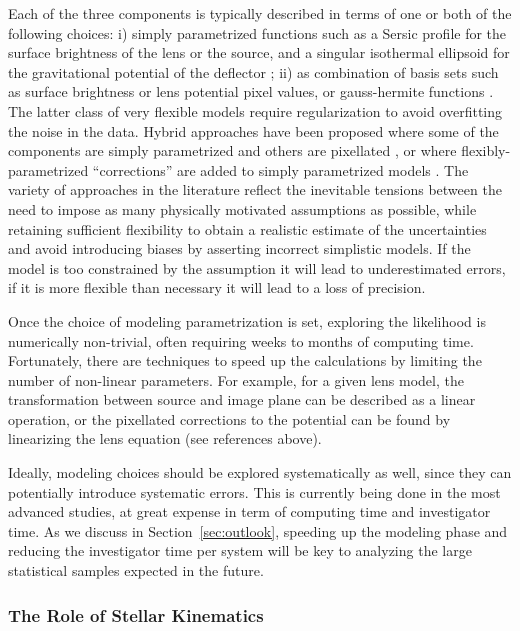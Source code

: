 Each of the three components is typically described in terms of one or
both of the following choices:
i) simply parametrized functions such as a Sersic profile
for the surface brightness of the lens or the source, and a singular
isothermal ellipsoid for the gravitational potential of the deflector
\citep[e.g.][]{Mar++07,Kee11}; ii) as combination of basis sets such as surface brightness
or lens potential pixel values, or gauss-hermite functions
\citep[e.g.][]{Col10, BirrerEtal2015, Nig++15}. The latter class of
very flexible models require regularization to avoid overfitting the
noise in the data. Hybrid approaches have been proposed where some of
the components are simply parametrized and others are pixellated
\citep{W+D03,T+K04,Suy++06}, or where flexibly-parametrized
``corrections'' are added to simply
parametrized models \citep{Koo05,V+K09,S+H10,Suy++10,BirrerEtal2015}.
The variety of
approaches in the literature reflect the inevitable tensions between
the need to impose as many physically motivated assumptions as
possible, while retaining sufficient flexibility to obtain a realistic
estimate of the uncertainties and avoid introducing biases by
asserting incorrect simplistic models. If the model is too constrained by the
assumption it will lead to underestimated errors, if it is more
flexible than necessary it will lead to a loss of precision.

Once the choice of modeling parametrization is set, exploring the
likelihood is numerically non-trivial, often requiring weeks to months
of computing time. Fortunately, there are techniques to speed up the
calculations by limiting the number of non-linear parameters. For
example, for a given lens model, the transformation between source and
image plane can be described as a linear operation, or the pixellated
corrections to the potential can be found by linearizing the lens
equation (see references above).

Ideally, modeling choices should be explored systematically as well,
since they can potentially introduce systematic errors. This is
currently being done in the most advanced studies, at great expense in
term of computing time and investigator time. As we discuss in
Section~\ref{sec:outlook}, speeding up the modeling phase and reducing
the investigator time per system will be key to analyzing the large
statistical samples expected in the future.


\subsubsection{The Role of Stellar Kinematics}

